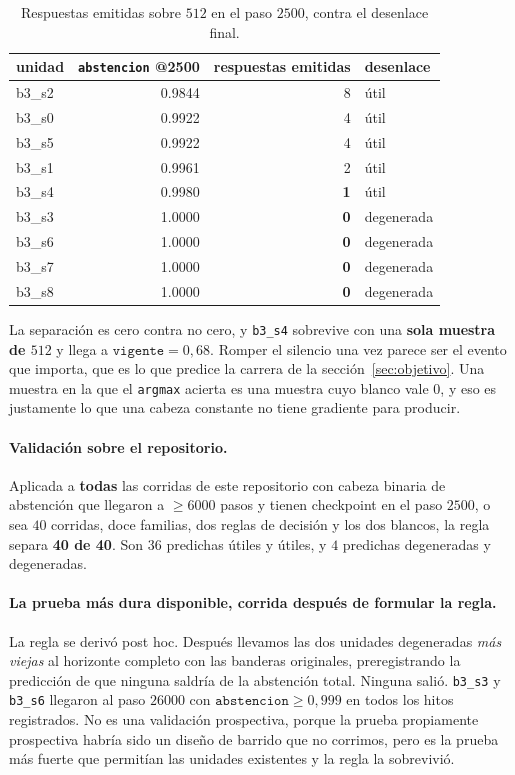 \documentclass[11pt,a4paper]{article}
\begin{document}
\begin{table}[h]
\centering
\caption{Respuestas emitidas sobre $512$ en el paso $2500$, contra el desenlace final.}
\begin{tabular}{lrrl}
\toprule
unidad & \texttt{abstencion} @2500 & respuestas emitidas & desenlace \\
\midrule
b3\_s2 & 0.9844 & 8 & útil \\
b3\_s0 & 0.9922 & 4 & útil \\
b3\_s5 & 0.9922 & 4 & útil \\
b3\_s1 & 0.9961 & 2 & útil \\
b3\_s4 & 0.9980 & \textbf{1} & útil \\
\midrule
b3\_s3 & 1.0000 & \textbf{0} & degenerada \\
b3\_s6 & 1.0000 & \textbf{0} & degenerada \\
b3\_s7 & 1.0000 & \textbf{0} & degenerada \\
b3\_s8 & 1.0000 & \textbf{0} & degenerada \\
\bottomrule
\end{tabular}
\label{tab:bifurcacion}
\end{table}

La separación es cero contra no cero, y \texttt{b3\_s4} sobrevive con una \textbf{sola muestra de
$512$} y llega a $\texttt{vigente} = 0{,}68$. Romper el silencio una vez parece ser el evento que
importa, que es lo que predice la carrera de la sección~\ref{sec:objetivo}. Una muestra en la que el
\texttt{argmax} acierta es una muestra cuyo blanco vale $0$, y eso es justamente lo que una cabeza
constante no tiene gradiente para producir.

\paragraph{Validación sobre el repositorio.} Aplicada a \textbf{todas} las corridas de este repositorio
con cabeza binaria de abstención que llegaron a $\geq 6000$ pasos y tienen checkpoint en el paso
$2500$, o sea $40$ corridas, doce familias, dos reglas de decisión y los dos blancos, la regla separa
\textbf{40 de 40}. Son $36$ predichas útiles y útiles, y $4$ predichas degeneradas y degeneradas.

\paragraph{La prueba más dura disponible, corrida después de formular la regla.} La regla se derivó
post hoc. Después llevamos las dos unidades degeneradas \emph{más viejas} al horizonte completo con las
banderas originales, preregistrando la predicción de que ninguna saldría de la abstención total.
Ninguna salió. \texttt{b3\_s3} y \texttt{b3\_s6} llegaron al paso $26000$ con
$\texttt{abstencion} \geq 0{,}999$ en todos los hitos registrados. No es una validación prospectiva,
porque la prueba propiamente prospectiva habría sido un diseño de barrido que no corrimos, pero es la
prueba más fuerte que permitían las unidades existentes y la regla la sobrevivió.
\end{document}
